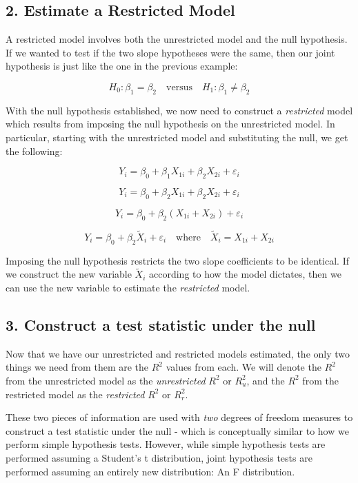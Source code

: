 \documentclass[
]{book}
\begin{document}
\subsection*{2. Estimate a Restricted Model}\label{estimate-a-restricted-model}

A restricted model involves both the unrestricted model and the null hypothesis. If we wanted to test if the two slope hypotheses were the same, then our joint hypothesis is just like the one in the previous example:

\[H_0:\beta_1=\beta_2 \quad \text{versus} \quad H_1:\beta_1 \neq \beta_2\]

With the null hypothesis established, we now need to construct a \emph{restricted} model which results from imposing the null hypothesis on the unrestricted model. In particular, starting with the unrestricted model and substituting the null, we get the following:

\[Y_i = \beta_0 + \beta_1 X_{1i} + \beta_2 X_{2i} + \varepsilon_i\]

\[Y_i = \beta_0 + \beta_2 X_{1i} + \beta_2 X_{2i} + \varepsilon_i\]

\[Y_i = \beta_0 + \beta_2 (X_{1i} + X_{2i}) + \varepsilon_i\]

\[Y_i = \beta_0 + \beta_2 \tilde{X}_{i} + \varepsilon_i \quad \text{where} \quad \tilde{X}_{i} = X_{1i} + X_{2i}\]

Imposing the null hypothesis restricts the two slope coefficients to be identical. If we construct the new variable \(\tilde{X}_i\) according to how the model dictates, then we can use the new variable to estimate the \emph{restricted} model.

\subsection*{3. Construct a test statistic under the null}\label{construct-a-test-statistic-under-the-null}

Now that we have our unrestricted and restricted models estimated, the only two things we need from them are the \(R^2\) values from each. We will denote the \(R^2\) from the unrestricted model as the \emph{unrestricted} \(R^2\) or \(R^2_u\), and the \(R^2\) from the restricted model as the \emph{restricted} \(R^2\) or \(R^2_r\).

These two pieces of information are used with \emph{two} degrees of freedom measures to construct a test statistic under the null - which is conceptually similar to how we perform simple hypothesis tests. However, while simple hypothesis tests are performed assuming a Student's t distribution, joint hypothesis tests are performed assuming an entirely new distribution: An F distribution.
\end{document}
